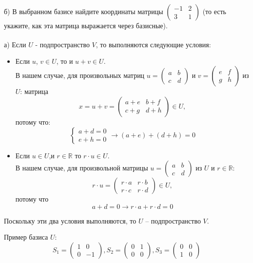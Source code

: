 \documentclass[a4paper,12pt]{article}
\begin{document}
б) В выбранном базисе найдите координаты матрицы $\left(\begin{smallmatrix}
-1 & 2 \\
3 & 1
\end{smallmatrix} \right)$ (то есть укажите, как эта матрица выражается через базисные). 
\vspace{5pt} \\
\\
а) Если $U$ - подпространство $V$, то выполняются следующие условия: 
\begin{itemize}
\item Если $u$, $v \in U$, то и $u+v \in U$. \\
В нашем случае, для произвольных матриц $u= \left(\begin{smallmatrix}
a & b \\
c & d
\end{smallmatrix}\right)$ и $v= \left(\begin{smallmatrix}
e & f \\
g & h
\end{smallmatrix}\right)$ из $U$: матрица 
$$x=u+v=\left(\begin{smallmatrix}
a+e & b+f \\
c+g & d+h
\end{smallmatrix}\right) \in U, $$
потому что:
$$\left\{
\begin{aligned}
a+d=0 \\
e+h=0 
\end{aligned}
\right.
\longrightarrow (a+e)+(d+h)=0 $$
\item Если $u \in U$,и $r \in \mathbb{R}$ то $r \cdot u \in U$. \\
В нашем случае, для произвольной матрицы $u= \left(\begin{smallmatrix}
a & b \\
c & d
\end{smallmatrix}\right)$ из $U$ и $r \in \mathbb{R}$: 
$$r \cdot u = \begin{pmatrix}
r \cdot a & r \cdot b \\
r \cdot c & r \cdot d
\end{pmatrix}\in U,$$ потому что
$$a+d =0 \longrightarrow r \cdot a + r \cdot d = 0$$
\end{itemize}
Поскольку эти два условия выполняются, то $U$ -- подпространство $V$.\par
Пример базиса $U$:
$$S_1=\begin{pmatrix}
1 & 0 \\
0 & -1
\end{pmatrix},
S_2=\begin{pmatrix}
0 & 1 \\
0 & 0
\end{pmatrix},
S_3=\begin{pmatrix}
0 & 0 \\
1 & 0
\end{pmatrix}
$$
\end{document}
